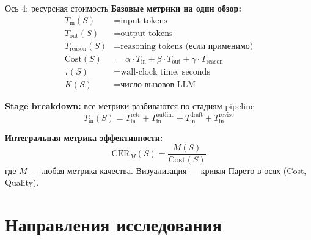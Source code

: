 \documentclass[10pt,aspectratio=169]{beamer}
\begin{document}
\begin{frame}{Ось 4: ресурсная стоимость}
  \textbf{Базовые метрики на один обзор:}
  \begin{align*}
    T_{\text{in}}(S) &= \text{input tokens} \\
    T_{\text{out}}(S) &= \text{output tokens} \\
    T_{\text{reason}}(S) &= \text{reasoning tokens (если применимо)} \\
    \text{Cost}(S) &= \alpha \cdot T_{\text{in}} + \beta \cdot T_{\text{out}} + \gamma \cdot T_{\text{reason}} \\
    \tau(S) &= \text{wall-clock time, seconds} \\
    K(S) &= \text{число вызовов LLM}
  \end{align*}

  \vspace{0.2cm}
  \textbf{Stage breakdown:} все метрики разбиваются по стадиям pipeline
  \[
    T_{\text{in}}(S) = T_{\text{in}}^{\text{retr}} + T_{\text{in}}^{\text{outline}} + T_{\text{in}}^{\text{draft}} + T_{\text{in}}^{\text{revise}}
  \]

  \vspace{0.3cm}
  \textbf{Интегральная метрика эффективности:}
  \[
    \text{CER}_M(S) = \frac{M(S)}{\text{Cost}(S)}
  \]
  где $M$ --- любая метрика качества. Визуализация --- кривая Парето в осях (Cost, Quality).
\end{frame}

\section{Направления исследования}
\end{document}
